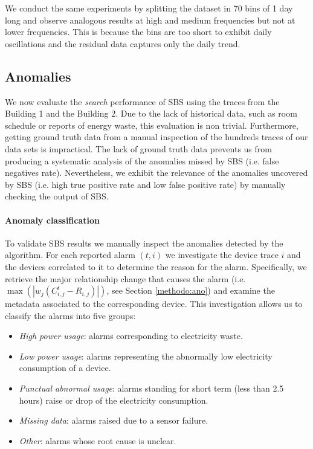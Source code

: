 We conduct the same experiments by splitting the dataset in 70 bins of 1 day long and observe analogous results at high and medium frequencies but not at lower frequencies.  This is because the bins are too short to exhibit daily oscillations and the residual data captures only the daily trend.


\subsection{Anomalies}
We now evaluate the \emph{search} performance of SBS using the traces from the Building 1 and the Building 2.
Due to the lack of historical data, such as room schedule or reports of energy waste, this evaluation is non trivial.
Furthermore, getting ground truth data from a manual inspection of the hundreds traces of our data sets is impractical.
The lack of ground truth data prevents us from producing a systematic analysis of the anomalies missed by SBS (i.e. false negatives rate).
Nevertheless, we exhibit the relevance of the anomalies uncovered by SBS (i.e. high true positive rate and low false positive rate) by manually checking the output of SBS.

\paragraph{Anomaly classification}
To validate SBS results we manually inspect the anomalies detected by the algorithm.  
For each reported alarm $(t,i)$ we investigate the device trace $i$ and the devices correlated to it
to determine the reason for the alarm.
Specifically, we retrieve the major relationship change that causes the alarm (i.e. $\max(|w_j(C_{i,j}^t - R_{i,j})|)$, 
see Section \ref{methodo:ano}) and examine the metadata associated to the corresponding device.
This investigation allows us to classify the alarms into five groups:
\begin{itemize}
 \item \emph{High power usage}: alarms corresponding to electricity waste.
 \item \emph{Low power usage}: alarms representing the abnormally low electricity consumption of a device.
 \item \emph{Punctual abnormal usage}: alarms standing for short term (less than 2.5 hours) raise or drop of the electricity consumption.
 \item \emph{Missing data}: alarms raised due to a sensor failure.
 \item \emph{Other}: alarms whose root cause is unclear.
\end{itemize}

